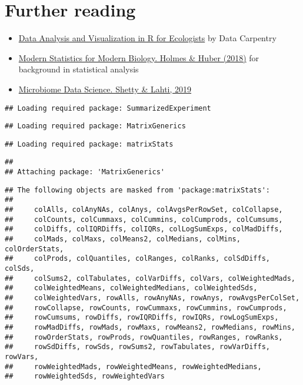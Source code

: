 \documentclass[
  oneside]{book}
\begin{document}
\hypertarget{further-reading}{%
\section{Further reading}\label{further-reading}}

\begin{itemize}
\item
  \href{https://datacarpentry.org/R-ecology-lesson/}{Data Analysis and Visualization in R for Ecologists} by Data Carpentry
\item
  \href{http://web.stanford.edu/class/bios221/book/}{Modern Statistics for Modern Biology. Holmes \& Huber (2018)} for background in statistical analysis
\item
  \href{https://openresearchlabs.github.io/publications/papers/2018-Shetty-Lahti-MDS.pdf}{Microbiome Data Science. Shetty \& Lahti, 2019}
\end{itemize}

\begin{verbatim}
## Loading required package: SummarizedExperiment
\end{verbatim}

\begin{verbatim}
## Loading required package: MatrixGenerics
\end{verbatim}

\begin{verbatim}
## Loading required package: matrixStats
\end{verbatim}

\begin{verbatim}
## 
## Attaching package: 'MatrixGenerics'
\end{verbatim}

\begin{verbatim}
## The following objects are masked from 'package:matrixStats':
## 
##     colAlls, colAnyNAs, colAnys, colAvgsPerRowSet, colCollapse,
##     colCounts, colCummaxs, colCummins, colCumprods, colCumsums,
##     colDiffs, colIQRDiffs, colIQRs, colLogSumExps, colMadDiffs,
##     colMads, colMaxs, colMeans2, colMedians, colMins, colOrderStats,
##     colProds, colQuantiles, colRanges, colRanks, colSdDiffs, colSds,
##     colSums2, colTabulates, colVarDiffs, colVars, colWeightedMads,
##     colWeightedMeans, colWeightedMedians, colWeightedSds,
##     colWeightedVars, rowAlls, rowAnyNAs, rowAnys, rowAvgsPerColSet,
##     rowCollapse, rowCounts, rowCummaxs, rowCummins, rowCumprods,
##     rowCumsums, rowDiffs, rowIQRDiffs, rowIQRs, rowLogSumExps,
##     rowMadDiffs, rowMads, rowMaxs, rowMeans2, rowMedians, rowMins,
##     rowOrderStats, rowProds, rowQuantiles, rowRanges, rowRanks,
##     rowSdDiffs, rowSds, rowSums2, rowTabulates, rowVarDiffs, rowVars,
##     rowWeightedMads, rowWeightedMeans, rowWeightedMedians,
##     rowWeightedSds, rowWeightedVars
\end{verbatim}
\end{document}
